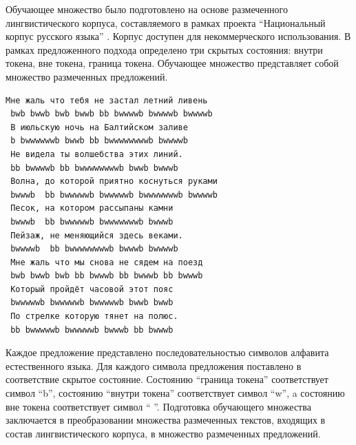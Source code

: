 Обучающее множество было подготовлено на основе размеченного лингвистического корпуса, составляемого в рамках проекта ``Национальный корпус русского языка'' \cite{natcorp_1, natcorp_2}. Корпус доступен для некоммерческого использования. В рамках предложенного подхода определено три скрытых состояния: внутри токена, вне токена, граница токена. Обучающее множество представляет собой множество размеченных предложений.
\begin{lstlisting}[caption={Фрагмент обучающего множества}]
 Мне жаль что тебя не застал летний ливень 
 bwb bwwb bwb bwwb bb bwwwwb bwwwwb bwwwwb
 В июльскую ночь на Балтийском заливе 
 b bwwwwwwb bwwb bb bwwwwwwwwb bwwwwb
 Не видела ты волшебства этих линий.
 bb bwwwwb bb bwwwwwwwwb bwwb bwwwb
 Волна, до которой приятно коснуться руками 
 bwwwb  bb bwwwwwb bwwwwwb bwwwwwwwb bwwwwb
 Песок, на котором рассыпаны камни 
 bwwwb  bb bwwwwwb bwwwwwwwb bwwwb
 Пейзаж, не меняющийся здесь веками.
 bwwwwb  bb bwwwwwwwwb bwwwb bwwwwb
 Мне жаль что мы снова не сядем на поезд 
 bwb bwwb bwb bb bwwwb bb bwwwb bb bwwwb
 Который пройдёт часовой этот пояс 
 bwwwwwb bwwwwwb bwwwwwb bwwb bwwb
 По стрелке которую тянет на полюс.
 bb bwwwwwb bwwwwwb bwwwb bb bwwwb
\end{lstlisting}
Каждое предложение представлено последовательностью символов алфавита естественного языка. Для каждого символа предложения поставлено в соответствие скрытое состояние. Состоянию ``граница токена'' соответствует символ ``b'', состоянию ``внутри токена'' соответствует символ ``w'', a состоянию вне токена соответствует символ `` ''. Подготовка обучающего множества заключается в преобразовании множества размеченных текстов, входящих в состав лингвистического корпуса, в множество размеченных предложений. 

